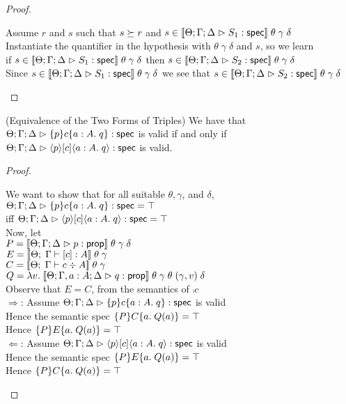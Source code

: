 \begin{proof}
\begin{tabbedproof}
    \oooo Assume $r$ and $s$ such that $s \worldgeq r$ and $s \in \interp{\judgeS{S_1}}\;\theta\;\gamma\;\delta$ \\
    \ooooo Instantiate the quantifier in the hypothesis with $\theta\;\gamma\;\delta$ and $s$, so we learn \\
    \ooooox if $s \in \interp{\judgeS{S_1}}\;\theta\;\gamma\;\delta$ then $s \in \interp{\judgeS{S_2}}\;\theta\;\gamma\;\delta$ \\
    \ooooo Since $s \in \interp{\judgeS{S_1}}\;\theta\;\gamma\;\delta$ we see that $s \in \interp{\judgeS{S_2}}\;\theta\;\gamma\;\delta$ \\
  \end{tabbedproof}
\end{proof}

\begin{lemma}{(Equivalence of the Two Forms of Triples)}
We have that $\judgeS{\spec{p}{c}{a:A}{q}}$ is valid if and only if $\judgeS{\mspec{p}{\comp{c}}{a:A}{q}}$ is valid.
\end{lemma}

\begin{proof}
\begin{tabbedproof}
\oo We want to show that for all suitable $\theta, \gamma$, and $\delta$, $\judgeS{\spec{p}{c}{a:A}{q}} = \top$  \\
\ox iff $\judgeS{\mspec{p}{\comp{c}}{a:A}{q}} = \top$  \\
\oo Now, let \\
\oox $P = \interp{\judgeA{p}{\assert}}\;\theta\;\gamma\;\delta$ \\
\oox $E = \interp{\judgeE[\Theta]{\Gamma}{[c]}{A}}\; \theta\;\gamma$ \\
\oox $C = \interp{\judgeC[\Theta]{\Gamma}{c}{A}}\; \theta\;\gamma$ \\
\oox $Q = \semfun{v}{\interp{\judgeA[\Theta;\Gamma, a:A; \Delta]{q}{\assert}}\;\theta\;\gamma\;\theta\;(\gamma, v)\;\delta}$ \\
\oo Observe that $E = C$, from the semantics of $\comp{c}$ \\
\oo $\Rightarrow$: Assume $\judgeS{\spec{p}{c}{a:A}{q}}$ is valid \\
\ooo Hence the semantic spec $\spec{P}{C}{a}{Q(a)} = \top$ \\
\ooo Hence $\spec{P}{E}{a}{Q(a)} = \top$ \\
\oo $\Leftarrow$: Assume $\judgeS{\mspec{p}{\comp{c}}{a:A}{q}}$ is valid \\
\ooo Hence the semantic spec $\spec{P}{E}{a}{Q(a)} = \top$ \\
\ooo Hence $\spec{P}{C}{a}{Q(a)} = \top$
\end{tabbedproof}
\end{proof}


